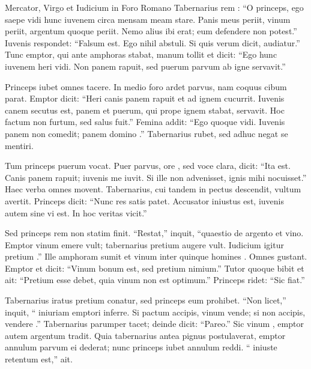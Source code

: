\documentclass[12pt]{nextbook}
\begin{document}
\begin{readersection}{Mercator, Virgo et Iudicium in Foro Romano}
Tabernarius rem : “O princeps, ego saepe vidi hunc iuvenem circa mensam meam stare. Panis meus periit, vinum periit, argentum quoque periit. Nemo alius ibi erat;  eum defendere non potest.” Iuvenis respondet: “Falsum est. Ego nihil abstuli. Si quis verum dicit, audiatur.” Tunc emptor, qui ante amphoras stabat, manum  tollit et dicit: “Ego hunc iuvenem heri vidi. Non panem rapuit, sed puerum parvum ab igne servavit.”

Princeps iubet omnes tacere. In medio foro ardet  parvus, nam coquus cibum parat. Emptor dicit: “Heri canis panem rapuit et  ad ignem cucurrit. Iuvenis canem secutus est, panem  et puerum, qui prope ignem stabat, servavit. Hoc factum non furtum, sed salus fuit.” Femina addit: “Ego quoque vidi. Iuvenis panem non comedit; panem domino .” Tabernarius rubet, sed adhuc negat se mentiri.

Tum princeps puerum vocat. Puer parvus, ore , sed voce clara, dicit: “Ita est. Canis panem rapuit; iuvenis me iuvit. Si ille non advenisset, ignis mihi nocuisset.” Haec verba omnes movent. Tabernarius, cui  tandem in pectus descendit, vultum avertit. Princeps dicit: “Nunc res satis patet. Accusator iniustus est, iuvenis autem  sine vi est. In hoc  veritas vicit.”

Sed princeps rem non statim finit. “Restat,” inquit, “quaestio de argento et vino. Emptor vinum emere vult; tabernarius pretium augere vult. Iudicium igitur pretium .” Ille amphoram sumit et vinum inter quinque homines . Omnes gustant. Emptor  et dicit: “Vinum bonum est, sed pretium nimium.” Tutor quoque bibit et ait: “Pretium  esse debet, quia vinum non est optimum.” Princeps ridet: “Sic fiat.”

Tabernarius iratus pretium  conatur, sed princeps eum prohibet. “Non licet,” inquit, “ iniuriam emptori inferre. Si pactum accipis, vinum vende; si non accipis, vendere .” Tabernarius parumper tacet; deinde dicit: “Pareo.” Sic vinum , emptor autem argentum  tradit. Quia tabernarius antea pignus postulaverat, emptor annulum parvum ei dederat; nunc princeps iubet annulum reddi. “ iniuste retentum est,” ait.


\end{readersection}
\end{document}
